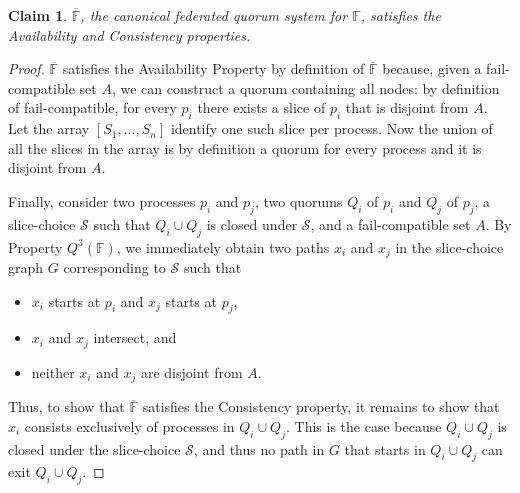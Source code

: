 \documentclass[11pt]{article}
\newtheorem{claim}{Claim}
\begin{document}
\begin{claim}
 $\overline{\mathbb{F}}$, the canonical federated quorum system for $\mathbb{F}$, satisfies the Availability and Consistency properties.
\end{claim}
\begin{proof}
  $\overline{\mathbb{F}}$ satisfies the Availability Property by definition of $\overline{\mathbb{F}}$ because, given a fail-compatible set $A$, we can construct a quorum containing all nodes: by definition of fail-compatible, for every $p_i$ there exists a slice of $p_i$ that is disjoint from $A$. Let the array $\left[S_1,...,S_n\right]$ identify one such slice per process. Now the union of all the slices in the array is by definition a quorum for every process and it is disjoint from $A$.


  Finally, consider two processes $p_i$ and $p_j$, two quorums $Q_i$ of $p_i$ and $Q_j$ of $p_j$, a slice-choice $\mathcal{S}$ such that $Q_i\cup Q_j$ is closed under $\mathcal{S}$, and a fail-compatible set $A$. By Property $Q^3(\mathbb{F})$, we immediately obtain two paths $x_i$ and $x_j$ in the slice-choice graph $G$ corresponding to $\mathcal{S}$ such that
    \begin{itemize}
      \item $x_i$ starts at $p_i$ and $x_j$ starts at $p_j$,
      \item $x_i$ and $x_j$ intersect, and
      \item neither $x_i$ and $x_j$ are disjoint from $A$.
    \end{itemize}
    Thus, to show that $\overline{\mathbb{F}}$ satisfies the Consistency property, it remains to show that $x_i$ consists exclusively of processes in $Q_i\cup Q_j$. This is the case because $Q_i\cup Q_j$ is closed under the slice-choice $\mathcal{S}$, and thus no path in $G$ that starts in $Q_i\cup Q_j$ can exit $Q_i\cup Q_j$.
\end{proof}
\end{document}
